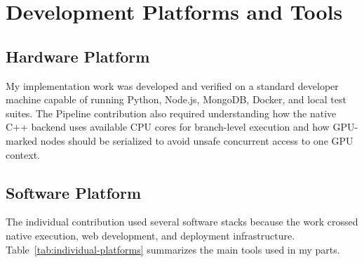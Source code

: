 \documentclass[12pt,a4paper,oneside]{report}
\begin{document}
\chapter{Development Platforms and Tools}
\label{chap:platforms-tools}

\section{Hardware Platform}
My implementation work was developed and verified on a standard developer machine capable of running Python, Node.js, MongoDB, Docker, and local test suites. The Pipeline contribution also required understanding how the native C++ backend uses available CPU cores for branch-level execution and how GPU-marked nodes should be serialized to avoid unsafe concurrent access to one GPU context.

\section{Software Platform}
The individual contribution used several software stacks because the work crossed native execution, web development, and deployment infrastructure. Table~\ref{tab:individual-platforms} summarizes the main tools used in my parts.
\end{document}
